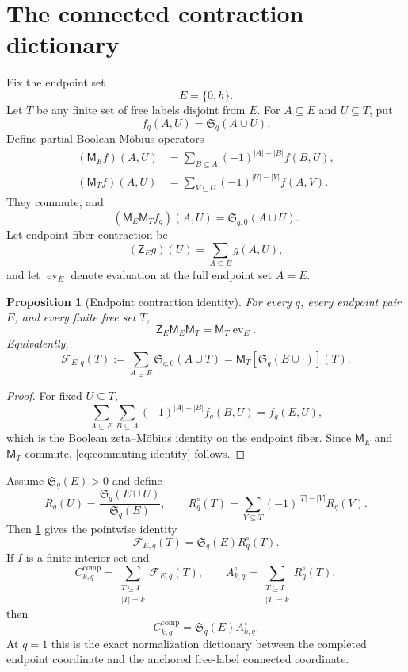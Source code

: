 \documentclass[11pt]{article}
\newtheorem{proposition}[theorem]{Proposition}
\theoremstyle{definition}
\theoremstyle{remark}
\newcommand{\SSer}{\mathfrak S}
\newcommand{\Mob}{\mathsf M}
\newcommand{\ZE}{\mathsf Z_E}
\newcommand{\evE}{\operatorname{ev}_E}
\newcommand{\1}{\mathbf 1}
\newcommand{\Fcal}{\mathcal F}
\begin{document}
\section{The connected contraction dictionary}\label{sec:dictionary}

Fix the endpoint set
\[
E=\{0,h\}.
\]
Let $T$ be any finite set of free labels disjoint from $E$.  For $A\subseteq E$ and $U\subseteq T$, put
\[
f_q(A,U)=\SSer_q(A\cup U).
\]
Define partial Boolean M\"obius operators
\begin{align}
(\Mob_E f)(A,U)
&=\sum_{B\subseteq A}(-1)^{|A|-|B|}f(B,U),\label{eq:ME}\\
(\Mob_T f)(A,U)
&=\sum_{V\subseteq U}(-1)^{|U|-|V|}f(A,V).\label{eq:MT}
\end{align}
They commute, and
\[
(\Mob_E\Mob_Tf_q)(A,U)=\SSer_{q,0}(A\cup U).
\]
Let endpoint-fiber contraction be
\[
(\ZE g)(U)=\sum_{A\subseteq E}g(A,U),
\]
and let $\evE$ denote evaluation at the full endpoint set $A=E$.

\begin{proposition}[Endpoint contraction identity]\label{prop:endpoint-contraction}
For every $q$, every endpoint pair $E$, and every finite free set $T$,
\begin{equation}\label{eq:commuting-identity}
\boxed{\ZE\Mob_E\Mob_T=\Mob_T\evE.}
\end{equation}
Equivalently,
\begin{equation}\label{eq:F_E}
\Fcal_{E,q}(T)
:=\sum_{A\subseteq E}\SSer_{q,0}(A\cup T)
=\Mob_T[\SSer_q(E\cup\cdot)](T).
\end{equation}
\end{proposition}

\begin{proof}
For fixed $U\subseteq T$,
\[
\sum_{A\subseteq E}\sum_{B\subseteq A}
(-1)^{|A|-|B|}f_q(B,U)
=f_q(E,U),
\]
which is the Boolean zeta--M\"obius identity on the endpoint fiber.  Since $\Mob_E$ and $\Mob_T$ commute, \eqref{eq:commuting-identity} follows.
\end{proof}

Assume $\SSer_q(E)>0$ and define
\begin{equation}\label{eq:Rq}
R_q(U)=\frac{\SSer_q(E\cup U)}{\SSer_q(E)},
\qquad
R_q^\circ(T)=\sum_{V\subseteq T}(-1)^{|T|-|V|}R_q(V).
\end{equation}
Then \cref{prop:endpoint-contraction} gives the pointwise identity
\begin{equation}\label{eq:F-Rcirc}
\boxed{\Fcal_{E,q}(T)=\SSer_q(E)R_q^\circ(T).}
\end{equation}
If $I$ is a finite interior set and
\[
C_{k,q}^{\mathrm{comp}}
=\sum_{\substack{T\subseteq I\\|T|=k}}\Fcal_{E,q}(T),
\qquad
A_{k,q}^{\circ}
=\sum_{\substack{T\subseteq I\\|T|=k}}R_q^\circ(T),
\]
then
\begin{equation}\label{eq:C-A-dictionary}
\boxed{C_{k,q}^{\mathrm{comp}}=\SSer_q(E)A_{k,q}^{\circ}.}
\end{equation}
At $q=1$ this is the exact normalization dictionary between the completed endpoint coordinate and the anchored free-label connected coordinate.
\end{document}
